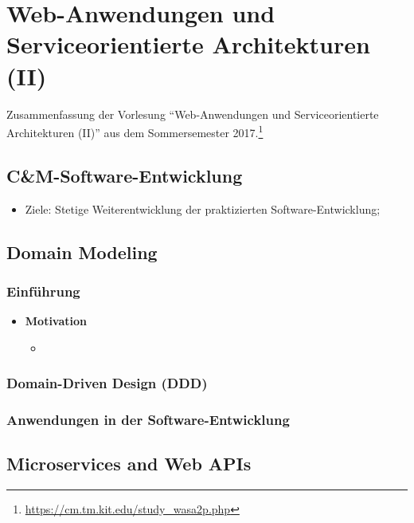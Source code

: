\chapter{Web-Anwendungen und Serviceorientierte Architekturen (II)}

Zusammenfassung der Vorlesung "`Web-Anwendungen und Serviceorientierte Architekturen (II)"' aus dem Sommersemester 2017.\footnote{\url{https://cm.tm.kit.edu/study_wasa2p.php}}

\section{C\&M-Software-Entwicklung}
\begin{itemize}
	\item Ziele: Stetige Weiterentwicklung der praktizierten Software-Entwicklung; 
\end{itemize}



\section{Domain Modeling}

\subsection{Einführung}
\begin{itemize}
	\item \textbf{Motivation}
	\begin{itemize}
		\item 
	\end{itemize}
\end{itemize}


\subsection{Domain-Driven Design (DDD)}


\subsection{Anwendungen in der Software-Entwicklung}



\section{Microservices and Web APIs}

